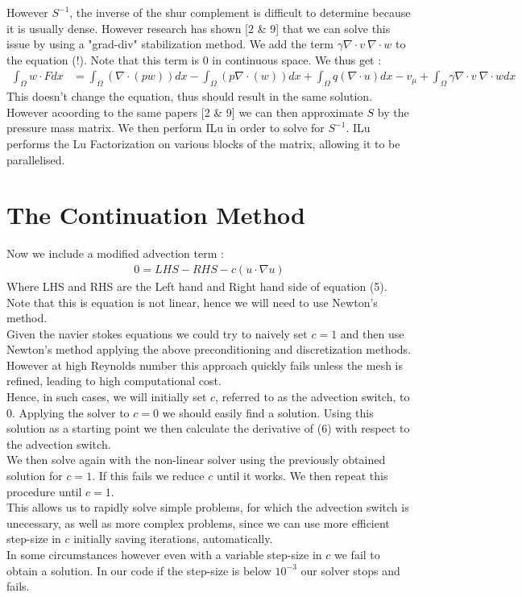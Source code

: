 \documentclass[11pt,twoside,a4paper]{article}
\begin{document}
 However $S^{-1}$, the inverse of the shur complement is difficult to determine because it is usually dense. However research has shown [2 \& 9] that we can solve this issue by using a "grad-div" stabilization method. We add the term $\gamma \nabla \cdot v \: \nabla \cdot w$ to the equation (!). Note that this term is 0 in continuous space. We thus get : 
\begin{align}
\int_\Omega w \cdot F dx &= \int_\Omega (\nabla \cdot (p w)) dx - \int_\Omega ( p \nabla \cdot (w)) dx + \int_\Omega q (\nabla \cdot u) dx  - v_\mu + \int_\Omega \gamma \nabla \cdot v \: \nabla \cdot w dx
\end{align}
This doesn't change the equation, thus should result in the same solution. However acoording to the same papers [2 \& 9] we can then approximate $S$ by the pressure mass matrix. We then perform ILu in order to solve for $S^{-1}$. ILu performs the Lu Factorization on various blocks of the matrix, allowing it to be parallelised.

\section{The Continuation Method}
Now we include a modified advection term : 
\begin{align}
0 = LHS - RHS - c ( u \cdot \nabla u) 
\end{align}
Where LHS and RHS are the Left hand and Right hand side of equation (5). Note that this is equation is not linear, hence we will need to use Newton's method.\\ 
Given the navier stokes equations we could try to naively set $c = 1$ and then use Newton's method applying the above preconditioning and discretization methods. However at high Reynolds number this approach quickly fails unless the mesh is refined, leading to high computational cost.\\
Hence, in such cases, we will initially set $c$, referred to as the advection switch, to $0$. Applying the solver to $c = 0$ we should easily find a solution. Using this solution as a starting point we then calculate the derivative of (6) with respect to the advection switch.\\
We then solve again with the non-linear solver using the previously obtained solution for $c = 1$. If this fails we reduce $c$ until it works. We then repeat this procedure until $c = 1$.\\
 This allows us to rapidly solve simple problems, for which the advection switch is unecessary, as well as more complex problems, since we can use more efficient step-size in $c$ initially saving iterations, automatically.\\
In some circumstances however even with a variable step-size in $c$ we fail to obtain a solution. In our code if the step-size is below $10^{-3}$ our solver stops and fails.
\end{document}
